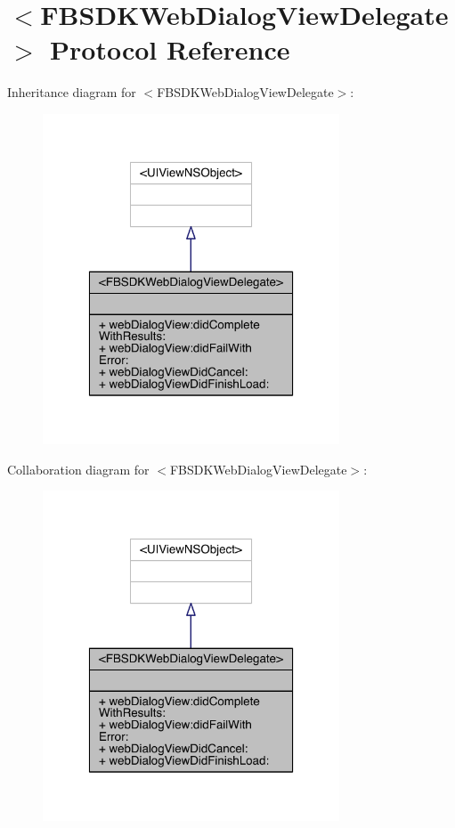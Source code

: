 \hypertarget{protocol_f_b_s_d_k_web_dialog_view_delegate-p}{\section{$<$F\-B\-S\-D\-K\-Web\-Dialog\-View\-Delegate$>$ Protocol Reference}
\label{protocol_f_b_s_d_k_web_dialog_view_delegate-p}
}


Inheritance diagram for $<$F\-B\-S\-D\-K\-Web\-Dialog\-View\-Delegate$>$\-:
\nopagebreak
\begin{figure}[H]
\begin{center}
\leavevmode
\includegraphics[width=250pt]{protocol_f_b_s_d_k_web_dialog_view_delegate-p__inherit__graph}
\end{center}
\end{figure}


Collaboration diagram for $<$F\-B\-S\-D\-K\-Web\-Dialog\-View\-Delegate$>$\-:
\nopagebreak
\begin{figure}[H]
\begin{center}
\leavevmode
\includegraphics[width=250pt]{protocol_f_b_s_d_k_web_dialog_view_delegate-p__coll__graph}
\end{center}
\end{figure}
